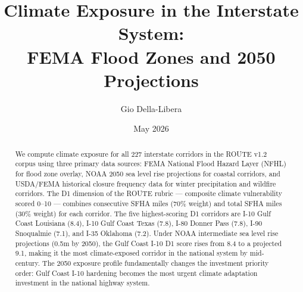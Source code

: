 \documentclass[12pt]{article}
\title{Climate Exposure in the Interstate System:\\
       FEMA Flood Zones and 2050 Projections}
\author{Gio Della-Libera}
\date{May 2026}
\begin{document}
\maketitle

\begin{abstract}
We compute climate exposure for all 227 interstate corridors in the ROUTE v1.2 corpus using
three primary data sources: FEMA National Flood Hazard Layer (NFHL) for flood zone overlay,
NOAA 2050 sea level rise projections for coastal corridors, and USDA/FEMA historical closure
frequency data for winter precipitation and wildfire corridors. The D1 dimension of the ROUTE
rubric --- composite climate vulnerability scored 0--10 --- combines consecutive SFHA miles
(70\% weight) and total SFHA miles (30\% weight) for each corridor. The five highest-scoring
D1 corridors are I-10 Gulf Coast Louisiana (8.4), I-10 Gulf Coast Texas (7.8), I-80 Donner
Pass (7.8), I-90 Snoqualmie (7.1), and I-35 Oklahoma (7.2). Under NOAA intermediate sea level
rise projections (0.5m by 2050), the Gulf Coast I-10 D1 score rises from 8.4 to a projected
9.1, making it the most climate-exposed corridor in the national system by mid-century. The
2050 exposure profile fundamentally changes the investment priority order: Gulf Coast I-10
hardening becomes the most urgent climate adaptation investment in the national highway system.
\end{abstract}











\end{document}
